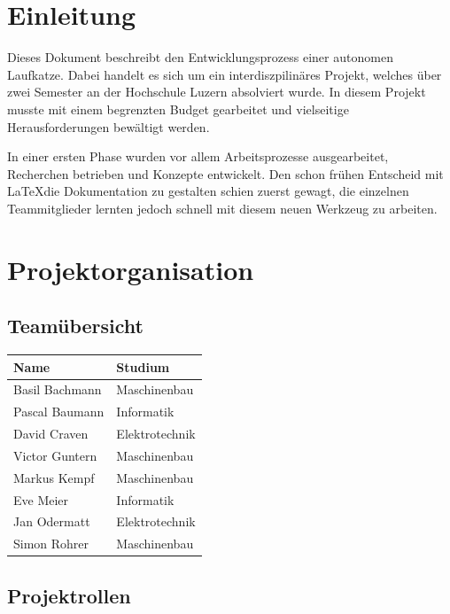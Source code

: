 \documentclass[a4paper]{report}
\begin{document}
\tableofcontents

\newpage


\chapter{Einleitung}
\label{ch:Intro}

Dieses Dokument beschreibt den Entwicklungsprozess einer autonomen Laufkatze. Dabei handelt es sich um ein interdiszpilinäres Projekt, welches über zwei Semester an der Hochschule Luzern absolviert wurde. In diesem Projekt musste mit einem begrenzten Budget gearbeitet und vielseitige Herausforderungen bewältigt werden.

In einer ersten Phase wurden vor allem Arbeitsprozesse ausgearbeitet, Recherchen betrieben und Konzepte entwickelt. Den schon frühen Entscheid mit \LaTeX die Dokumentation zu gestalten schien zuerst gewagt, die einzelnen Teammitglieder lernten jedoch schnell mit diesem neuen Werkzeug zu arbeiten.

\chapter{Projektorganisation}

\section{Teamübersicht}

\begin{tabular}{|p{}|p{}|}
	\hline
	\textbf{Name} & \textbf{Studium} \\
	\hline
	Basil Bachmann & Maschinenbau \\
	\hline
	Pascal Baumann & Informatik \\
	\hline
	David Craven & Elektrotechnik \\
	\hline
	Victor Guntern & Maschinenbau \\
	\hline
	Markus Kempf & Maschinenbau \\
	\hline
	Eve Meier & Informatik \\
	\hline
	Jan Odermatt & Elektrotechnik \\
	\hline
	Simon Rohrer & Maschinenbau \\
	\hline
\end{tabular}

\section{Projektrollen}
\end{document}
